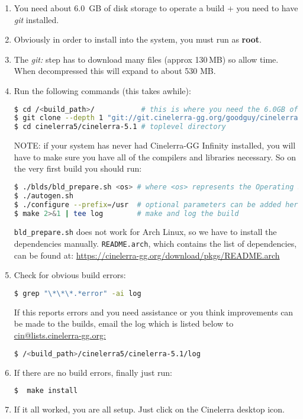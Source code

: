 \begin{enumerate}
    \item 
        You need about 6.0 \,GB of disk storage to operate a build + you need to have \textit{git} installed.
    \item  Obviously in order to install into the system, you must run as \textbf{root}.
    \item  The \textit{git:} step has to download many files (approx 130\,MB) so allow time.  When decompressed this will expand to about 530 MB.
    \item  Run the following commands (this takes awhile):

        \begin{lstlisting}[language=bash,numbers=none]
$ cd /<build_path>/           # this is where you need the 6.0GB of disk space
$ git clone --depth 1 "git://git.cinelerra-gg.org/goodguy/cinelerra.git" cinelerra5 
$ cd cinelerra5/cinelerra-5.1 # toplevel directory
        \end{lstlisting}

        NOTE: if your system has never had Cinelerra-GG Infinity installed, you will have to make sure you have all of the compilers and libraries necessary.  
        So on the very first build you should run:

        \begin{lstlisting}[language=bash,numbers=none]
$ ./blds/bld_prepare.sh <os> # where <os> represents the Operating System of Centos, Fedora, Suse, Leap, Ubuntu, Debian.
$ ./autogen.sh
$ ./configure --prefix=/usr  # optional parameters can be added here
$ make 2>&1 | tee log        # make and log the build
        \end{lstlisting}
        \texttt{bld\_prepare.sh} does not work for Arch Linux, so we have to install the dependencies manually. \texttt{README.arch}, which contains the list of dependencies, can be found at: {\small \url{https://cinelerra-gg.org/download/pkgs/README.arch}}
    \item  Check for obvious build errors:
        \begin{lstlisting}[language=bash,numbers=none]
$ grep "\*\*\*.*error" -ai log
        \end{lstlisting}
        If this reports errors and you need assistance or you think improvements can be made to the builds,
        email the log which is listed below to {\small \url{cin@lists.cinelerra-gg.org:}}
        \begin{lstlisting}[language=bash,numbers=none]
$ /<build_path>/cinelerra5/cinelerra-5.1/log
        \end{lstlisting}
    \item  If there are no build errors, finally just run:
        \begin{lstlisting}[language=bash,numbers=none]
   $  make install
        \end{lstlisting}
    \item  If it all worked, you are all setup. Just click on the Cinelerra desktop icon.
\end{enumerate}

